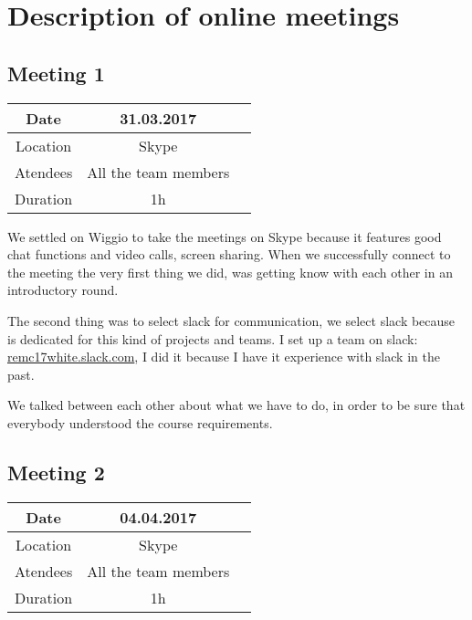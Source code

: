 
\chapter{Description of online meetings} %

\label{Meetings} %

\section{Meeting 1}
\begin{center}
\begin{tabular}{| c | c | c }
	\hline
	Date &  31.03.2017   \\
	\hline
	Location & Skype  \\
	\hline
	Atendees & All the team members   \\
	\hline
	Duration & 1h  \\
	\hline
\end{tabular}
\end{center}
We settled on Wiggio to take the meetings on Skype because it features good chat functions and video calls, screen sharing. When we successfully connect to the meeting the very first thing we did, was getting know with each other in an introductory round.

The second thing was to select slack for communication, we select slack because is dedicated for this kind of projects and teams. I set up a team on slack: \href{https://remc17white.slack.com}{remc17white.slack.com}, I did it because I have it experience with slack in the past.

We talked between each other about what we have to do, in order to be sure that everybody understood the course requirements.

\section{Meeting 2}
\begin{center}
	\begin{tabular}{| c | c | c }
		\hline
		Date &  04.04.2017\\
		\hline
		Location & Skype  \\
		\hline
		Atendees & All the team members   \\
		\hline
		Duration & 1h  \\
		\hline
	\end{tabular}
\end{center}

